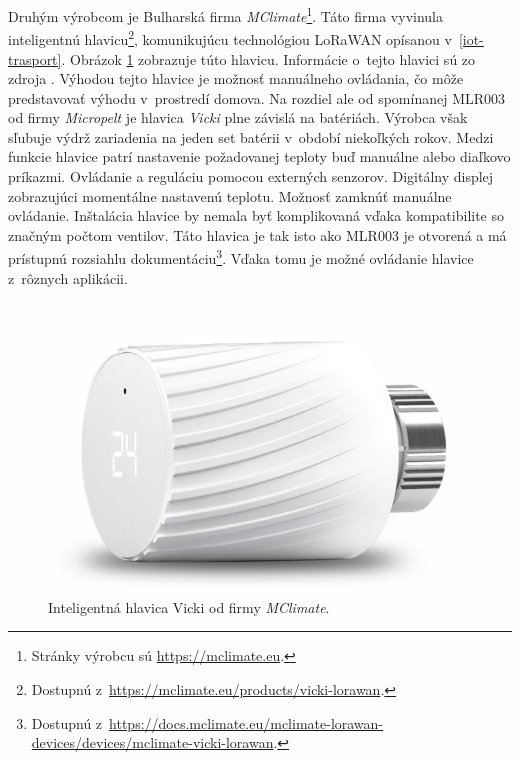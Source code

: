 Druhým výrobcom je Bulharská firma \emph{MClimate}\footnote{Stránky výrobcu sú \url{https://mclimate.eu}.}. 
Táto firma vyvinula inteligentnú hlavicu\footnote{Dostupnú z~\url{https://mclimate.eu/products/vicki-lorawan}.}, komunikujúcu technológiou LoRaWAN opísanou v~\ref{iot-trasport}. Obrázok \ref{fig:LORA-MCLIMATE} zobrazuje túto hlavicu.
Informácie o~tejto hlavici sú zo zdroja \cite{vicki}.
Výhodou tejto hlavice je možnosť manuálneho ovládania, čo môže predstavovať výhodu v~prostredí domova. 
Na rozdiel ale od spomínanej MLR003 od firmy \emph{Micropelt} je hlavica \emph{Vicki} plne závislá na batériách. 
Výrobca však sľubuje výdrž zariadenia na jeden set batérii v~období niekoľkých rokov. 
Medzi funkcie hlavice patrí nastavenie požadovanej teploty buď manuálne alebo diaľkovo príkazmi.
Ovládanie a reguláciu pomocou externých senzorov.
Digitálny displej zobrazujúci momentálne nastavenú teplotu. 
Možnosť zamknúť manuálne ovládanie. 
Inštalácia hlavice by nemala byť komplikovaná vďaka kompatibilite so značným počtom ventilov.
Táto hlavica je tak isto ako MLR003 je otvorená a má prístupnú rozsiahlu dokumentáciu\footnote{Dostupnú z~\url{https://docs.mclimate.eu/mclimate-lorawan-devices/devices/mclimate-vicki-lorawan}.}. 
Vďaka tomu je možné ovládanie hlavice z~rôznych aplikácii.
\begin{figure}[H]
    \centering
    \includegraphics[scale=0.285]{obrazky-figures/vicky.png}
    \caption{Inteligentná hlavica Vicki od firmy \emph{MClimate}.}
    \label{fig:LORA-MCLIMATE}
\end{figure}

